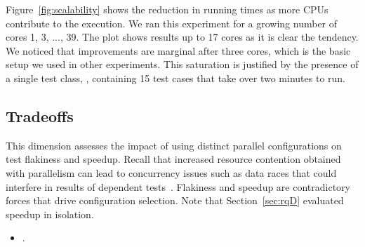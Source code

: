 Figure~\ref{fig:scalability} shows the reduction in running times as
more CPUs contribute to the execution.  We ran this experiment for a
growing number of cores 1, 3, ..., 39.  The plot shows results up to
17 cores as it is clear the tendency.  We noticed that improvements
are marginal after three cores, which is the basic setup we used in
other experiments.  This saturation is justified by the presence of a
single test class, , containing 15 test
cases that take over two minutes to run.

\begin{center}
\end{center}

\subsection{Tradeoffs}
\label{sec:rq6-tradeoffs}


This dimension assesses the impact of using distinct parallel
configurations on test flakiness and speedup.  Recall that increased
resource contention obtained with parallelism can lead to concurrency
issues such as data races that could interfere in results of dependent
tests~\cite{luo-etal-fse2014,bell-etal-esecfse2015}.  Flakiness and
speedup are contradictory forces that drive configuration selection.
Note that Section~\ref{sec:rqD} evaluated speedup in isolation.

\begin{itemize}
    \item \numRQIssuesOne{}. \textbf{\RQIssuesOne{}}
\end{itemize}



